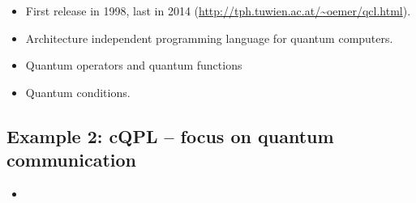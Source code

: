 \documentclass{beamer}
\begin{document}
\begin{frame}{\insertsection}{\insertsubsection}
	\begin{itemize}
		\item<1-> First release in 1998, last in 2014 
		(\url{http://tph.tuwien.ac.at/~oemer/qcl.html}).
		\item<2-> Architecture independent programming language for quantum 
		computers.
		\item<3-> Quantum operators and quantum functions
		\item<4-> Quantum conditions.
	\end{itemize}
	
\end{frame}

\begin{frame}{\insertsection}{\insertsubsection}
	
\end{frame}

\begin{frame}{\insertsection}{\insertsubsection}
	
\end{frame}

\begin{frame}{\insertsection}{\insertsubsection}
	
\end{frame}


\subsection{Example 2: cQPL -- focus on quantum communication}

\begin{frame}{\insertsection}{\insertsubsection}
    \begin{itemize}
        \item<1-> 
    \end{itemize}
\end{frame}

\begin{frame}{\insertsection}{\insertsubsection}
    
\end{frame}
\end{document}

